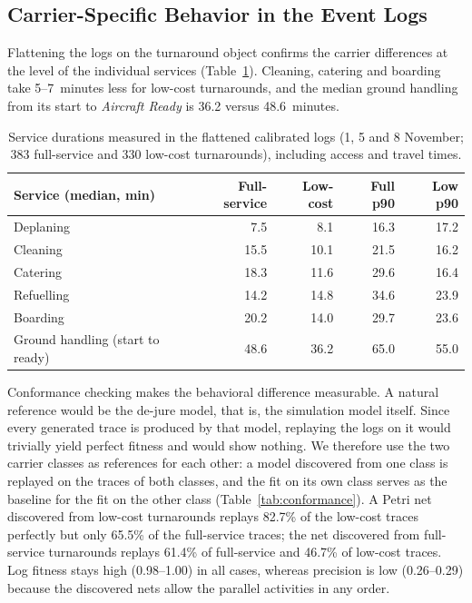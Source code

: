 \subsection{Carrier-Specific Behavior in the Event Logs}
Flattening the logs on the turnaround object confirms the carrier differences at the level of the individual services (Table~\ref{tab:pmdurations}). Cleaning, catering and boarding take 5--7~minutes less for low-cost turnarounds, and the median ground handling from its start to \emph{Aircraft Ready} is 36.2 versus 48.6~minutes.

\begin{table}[htbp]\centering\small
\begin{tabular}{lrrrr}\hline
Service (median, min) & Full-service & Low-cost & Full p90 & Low p90\\\hline
Deplaning & 7.5 & 8.1 & 16.3 & 17.2\\
Cleaning & 15.5 & 10.1 & 21.5 & 16.2\\
Catering & 18.3 & 11.6 & 29.6 & 16.4\\
Refuelling & 14.2 & 14.8 & 34.6 & 23.9\\
Boarding & 20.2 & 14.0 & 29.7 & 23.6\\
Ground handling (start to ready) & 48.6 & 36.2 & 65.0 & 55.0\\\hline
\end{tabular}
\caption{Service durations measured in the flattened calibrated logs (1, 5 and 8 November; 383 full-service and 330 low-cost turnarounds), including access and travel times.}
\label{tab:pmdurations}
\end{table}

Conformance checking makes the behavioral difference measurable. A natural reference would be the de-jure model, that is, the simulation model itself. Since every generated trace is produced by that model, replaying the logs on it would trivially yield perfect fitness and would show nothing. We therefore use the two carrier classes as references for each other: a model discovered from one class is replayed on the traces of both classes, and the fit on its own class serves as the baseline for the fit on the other class (Table~\ref{tab:conformance}). A Petri net discovered from low-cost turnarounds replays 82.7\% of the low-cost traces perfectly but only 65.5\% of the full-service traces; the net discovered from full-service turnarounds replays 61.4\% of full-service and 46.7\% of low-cost traces. Log fitness stays high (0.98--1.00) in all cases, whereas precision is low (0.26--0.29) because the discovered nets allow the parallel activities in any order.

